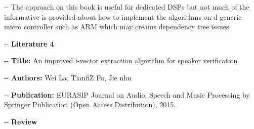 \documentclass[12pt]{article}
\makeatletter
\newenvironment{indentation}[3]%
	{\par\setlength{\parindent}{#3}
	\setlength{\leftmargin}{#1}       \setlength{\rightmargin}{#2}%
	\advance\linewidth -\leftmargin       \advance\linewidth -\rightmargin%
	\advance\@totalleftmargin\leftmargin  \@setpar{{\@@par}}%
	\parshape 1\@totalleftmargin \linewidth\ignorespaces}{\par}%
\makeatother
\begin{document}
\begin{indentation}{0pt}{0pt}{0pt}
The approach on this book is useful for dedicated DSPs but not much of the
informative is provided about how to implement the algorithms on d generic
micro controller such as ARM which may creams dependency tree issues.
\end{indentation}
\pagebreak
\begin{center}
\begin{indentation}{0pt}{0pt}{0pt}
\textbf{{\large Literature 4}}
\end{indentation}
\end{center}

\begin{indentation}{21pt}{0pt}{-21pt}
\textbf{Title:} An improved i-vector extraction algorithm for speaker
verification
\end{indentation}

\begin{indentation}{0pt}{0pt}{0pt}
\textbf{Authors: }Wei La, TianfiZ Fu, Jie nhu
\end{indentation}

\begin{indentation}{67pt}{0pt}{-66pt}
\textbf{Publication: }EURASIP Journal on Audio, Speech and Music Processing by
Springer Publication (Open Access Distribution), 2015.
\end{indentation}

\begin{center}
\begin{indentation}{0pt}{0pt}{0pt}
\textbf{{\large Review}}
\end{indentation}
\end{center}
\end{document}
